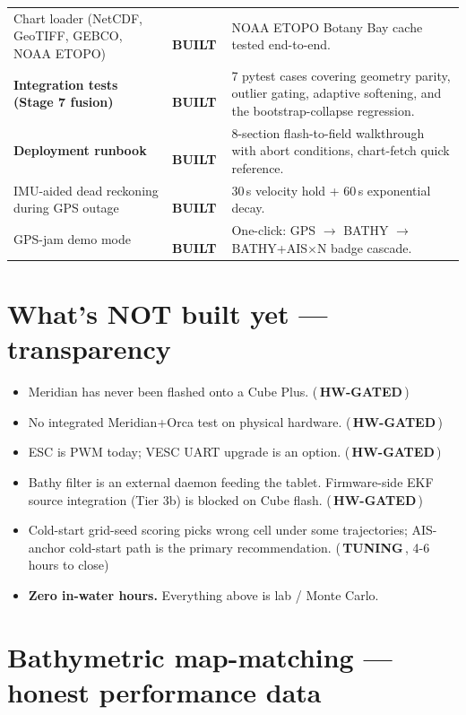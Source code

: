 \documentclass[10pt,a4paper]{article}
\newcommand{\statusbuilt}{{\color{white}\colorbox{mSafe}{\small\bfseries\,BUILT\,}}}
\newcommand{\statustuning}{{\color{white}\colorbox{mWarn}{\small\bfseries\,TUNING\,}}}
\newcommand{\statushardware}{{\color{white}\colorbox{mDim}{\small\bfseries\,HW-GATED\,}}}
\begin{document}
\begin{tabularx}{\textwidth}{@{}l l X@{}}
Chart loader (NetCDF, GeoTIFF, GEBCO, NOAA ETOPO) & \statusbuilt & NOAA ETOPO Botany Bay cache tested end-to-end. \\
\rowcolor{mRow} \textbf{Integration tests (Stage 7 fusion)} & \statusbuilt & 7 pytest cases covering geometry parity, outlier gating, adaptive softening, and the bootstrap-collapse regression. \\
\textbf{Deployment runbook} & \statusbuilt & 8-section flash-to-field walkthrough with abort conditions, chart-fetch quick reference. \\
\rowcolor{mRow} IMU-aided dead reckoning during GPS outage & \statusbuilt & 30\,s velocity hold + 60\,s exponential decay. \\
GPS-jam demo mode & \statusbuilt & One-click: GPS $\to$ BATHY $\to$ BATHY+AIS$\times$N badge cascade. \\
\bottomrule
\end{tabularx}

\section{What's NOT built yet — transparency}
\begin{itemize}
\item Meridian has never been flashed onto a Cube Plus. (\statushardware)
\item No integrated Meridian+Orca test on physical hardware. (\statushardware)
\item ESC is PWM today; VESC UART upgrade is an option. (\statushardware)
\item Bathy filter is an external daemon feeding the tablet. Firmware-side EKF source integration (Tier 3b) is blocked on Cube flash. (\statushardware)
\item Cold-start grid-seed scoring picks wrong cell under some trajectories; AIS-anchor cold-start path is the primary recommendation. (\statustuning, 4-6 hours to close)
\item \textbf{Zero in-water hours.} Everything above is lab / Monte Carlo.
\end{itemize}

\pagebreak

\section{Bathymetric map-matching — honest performance data}
\end{document}
